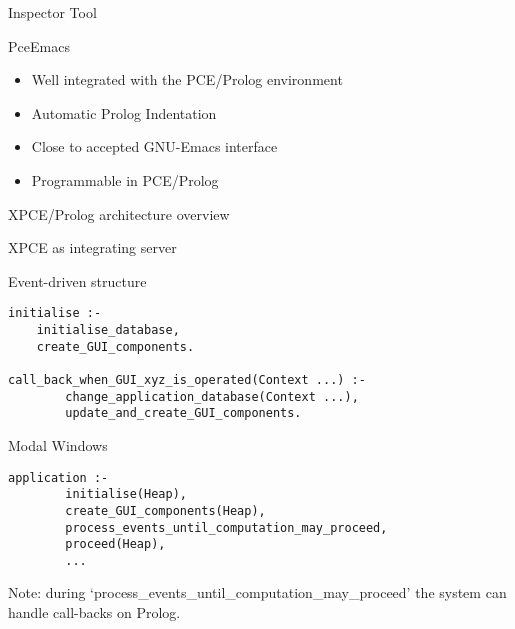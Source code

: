 \begin{sli}{Inspector Tool}
\end{sli}


\begin{sli}{PceEmacs}
\begin{itemize}
    \item Well integrated with the PCE/Prolog environment
    \item Automatic Prolog Indentation
    \item Close to accepted GNU-Emacs interface
    \item Programmable in PCE/Prolog
\end{itemize}
\end{sli}


\begin{sli}{XPCE/Prolog architecture overview}


\end{sli}

\begin{sli}{XPCE as integrating server}


\end{sli}



\begin{sli}{Event-driven structure}
\begin{verbatim}
initialise :-
    initialise_database,
    create_GUI_components.

call_back_when_GUI_xyz_is_operated(Context ...) :-
        change_application_database(Context ...),
        update_and_create_GUI_components.
\end{verbatim}

\noindent
\end{sli}

\begin{sli}{Modal Windows}
\begin{verbatim}
application :-
        initialise(Heap),
        create_GUI_components(Heap),
        process_events_until_computation_may_proceed,
        proceed(Heap),
        ...
\end{verbatim}

\noindent
Note: during `process_events_until_computation_may_proceed' the system
can handle call-backs on Prolog.
\end{sli}

